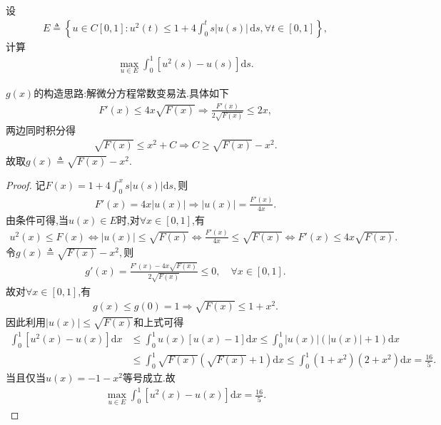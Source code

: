 \documentclass[../../main.tex]{subfiles}%
\begin{document}
\begin{example}
设
\begin{align*}
E \triangleq \left\{ u \in C[0,1] : u^2(t) \leqslant 1 + 4 \int_0^t s|u(s)| \, \mathrm{d}s, \forall t \in [0,1] \right\},
\end{align*}
计算
\begin{align*}
\max_{u \in E} \int_0^1 \left[ u^2(s) - u(s) \right] \mathrm{d}s.
\end{align*}
\end{example}
\begin{note}
$g(x)$的构造思路:解微分方程常数变易法.具体如下
\begin{align*}
F'(x) \leqslant 4x\sqrt{F(x)} \Longrightarrow \frac{F'(x)}{2\sqrt{F(x)}} \leqslant 2x,
\end{align*}
两边同时积分得
\begin{align*}
\sqrt{F(x)} \leqslant x^2 + C \Longrightarrow C \geqslant \sqrt{F(x)} - x^2.
\end{align*}
故取$g(x) \triangleq \sqrt{F(x)} - x^2.$
\end{note}
\begin{proof}
记$F(x) = 1 + 4\int_0^x s|u(s)|\mathrm{d}s,$则
\begin{align*}
F'(x) = 4x|u(x)| \Longrightarrow |u(x)| = \frac{F'(x)}{4x}.
\end{align*}
由条件可得,当$u(x) \in E$时,对$\forall x \in [0,1]$,有
\begin{align*}
u^2(x) \leqslant F(x) \Longleftrightarrow |u(x)| \leqslant \sqrt{F(x)} \Longleftrightarrow \frac{F'(x)}{4x} \leqslant \sqrt{F(x)} \Longleftrightarrow F'(x) \leqslant 4x\sqrt{F(x)}.
\end{align*}
令$g(x) \triangleq \sqrt{F(x)} - x^2,$则
\begin{align*}
g'(x) = \frac{F'(x) - 4x\sqrt{F(x)}}{2\sqrt{F(x)}} \leqslant 0, \quad \forall x \in [0,1].
\end{align*}
故对$\forall x \in [0,1]$,有
\begin{align*}
g(x) \leqslant g(0) = 1 \Longrightarrow \sqrt{F(x)} \leqslant 1 + x^2.
\end{align*}
因此利用$|u(x)| \leqslant \sqrt{F(x)}$和上式可得
\begin{align*}
\int_0^1 \left[ u^2(x) - u(x) \right] \mathrm{d}x &\leqslant \int_0^1 u(x) \left[ u(x) - 1 \right] \mathrm{d}x \leqslant \int_0^1 |u(x)| \left( |u(x)| + 1 \right) \mathrm{d}x \\
&\leqslant \int_0^1 \sqrt{F(x)} \left( \sqrt{F(x)} + 1 \right) \mathrm{d}x \leqslant \int_0^1 \left( 1 + x^2 \right) \left( 2 + x^2 \right) \mathrm{d}x = \frac{16}{5}.
\end{align*}
当且仅当$u(x) = -1 - x^2$等号成立.故
\begin{align*}
\max_{u \in E} \int_0^1 \left[ u^2(x) - u(x) \right] \mathrm{d}x = \frac{16}{5}.
\end{align*}
\end{proof}
\end{document}
